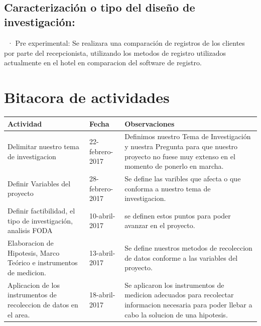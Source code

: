 \documentclass[a4paper,10pt]{report}
\begin{document}
\ 

\subsection{Caracterización o tipo del diseño de investigación: }
\  
· Pre experimental: Se realizara una comparación de registros de los clientes por parte del recepcionista, utilizando los metodos de registro utilizados actualmente en el hotel en comparacion del software de registro.

\section{Bitacora de actividades}
\begin{table}[H]
\centering
\begin{tabular}{|p{6cm}|p{2cm}|p{6cm}|}
\hline
Actividad & Fecha & Observaciones \\
\hline \hline
Delimitar nuestro tema de investigacion & 22-febrero-2017 & Definimos nuestro Tema de Investigación y nuestra Pregunta para que nuestro proyecto no fuese muy extenso en el momento de ponerlo en marcha. \\
\hline
Definir Variables del proyecto & 28-febrero-2017 & Se define las varibles que afecta o que conforma a nuestro tema de investigacion. \\
\hline
Definir factibilidad, el tipo de investigación, analisis FODA & 10-abril-2017 & se definen estos puntos para poder avanzar en el proyecto.\\
\hline
Elaboracion de Hipotesis, Marco Teórico e instrumentos de medicion. & 13-abril-2017 & Se define nuestros metodos de recoleccion de datos conforme a las variables del proyecto. \\
\hline
Aplicacion de los instrumentos de recoleccion de datos en el area. & 18-abril-2017 & Se aplicaron los instrumentos de medicion adecuados para recolectar informacion necesaria para poder llebar a cabo la solucion de una hipotesis.\\
\hline 


\end{tabular}

\end{table}
\end{document}
